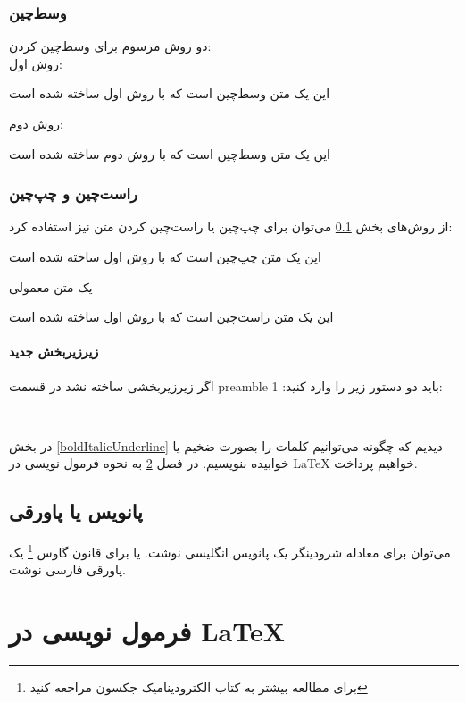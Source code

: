 \documentclass[12pt]{book}
\begin{document}
\subsection{وسط‌‌چین}\label{centeringSubsection}
دو روش مرسوم برای وسط‌چین کردن:\\
روش اول:\\
\begin{center}
	این یک متن وسط‌چین است که با روش اول ساخته شده‌ است
\end{center}
روش دوم:\\
\centerline{	این یک متن وسط‌چین است که با روش دوم ساخته شده‌ است}
\subsection{راست‌چین و چپ‌چین}
از روش‌های بخش
\ref{centeringSubsection}
می‌توان برای چپ‌چین یا راست‌چین کردن متن نیز استفاده کرد:\\
\begin{flushleft}
		این یک متن چپ‌چین است که با روش اول ساخته شده‌ است
\end{flushleft}

یک متن معمولی
\begin{flushright}
			این یک متن راست‌چین است که با روش اول ساخته شده‌ است
\end{flushright}
\subsubsection{زیرزیربخش جدید}
اگر زیرزیربخشی ساخته نشد در قسمت 
preamble
باید دو دستور زیر را وارد کنید:
1:
\begin{center}
	 \\
\end{center}
در بخش
\ref{boldItalicUnderline}
دیدیم که چگونه می‌توانیم کلمات را بصورت ضخیم یا خوابیده بنویسیم.
در فصل
\ref{writingFormula}
به نحوه فرمول نویسی در
\LaTeX
خواهیم پرداخت.

\section{پانویس یا پاورقی}
می‌توان برای معادله شرودینگر
یک پانویس انگلیسی نوشت.
یا برای قانون گاوس
\footnote{برای مطالعه بیشتر به کتاب الکترودینامیک جکسون مراجعه کنید}
یک پاورقی فارسی نوشت.





\chapter{فرمول نویسی در \LaTeX}\label{writingFormula}
\end{document}
